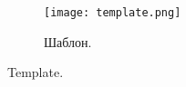 \documentclass{../tools/letask}
\begin{document}
%
%
%
%
\begin{figure}[H]
\centering
\texttt{[image: template.png]}
\caption{Шаблон.}
\end{figure}
%
Template.
%
%
%
%
\end{document}
